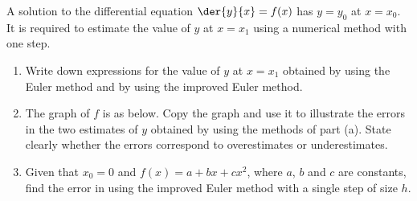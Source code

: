 \begin{problem}
    A solution to the differential equation $\der{y}{x} = f(x)$ has $y = y_0$ at $x = x_0$. It is required to estimate the value of $y$ at $x = x_1$ using a numerical method with one step.
    \begin{enumerate}
        \item Write down expressions for the value of $y$ at $x = x_1$ obtained by using the Euler method and by using the improved Euler method.
        \item The graph of $f$ is as below. Copy the graph and use it to illustrate the errors in the two estimates of $y$ obtained by using the methods of part (a). State clearly whether the errors correspond to overestimates or underestimates.
    \end{enumerate}
    \begin{center}
    \end{center}
    \begin{enumerate}
        \setcounter{enumi}{2}
        \item Given that $x_0 = 0$ and $f(x) = a + bx + cx^2$, where $a$, $b$ and $c$ are constants, find the error in using the improved Euler method with a single step of size $h$.
    \end{enumerate}
\end{problem}
\clearpage
